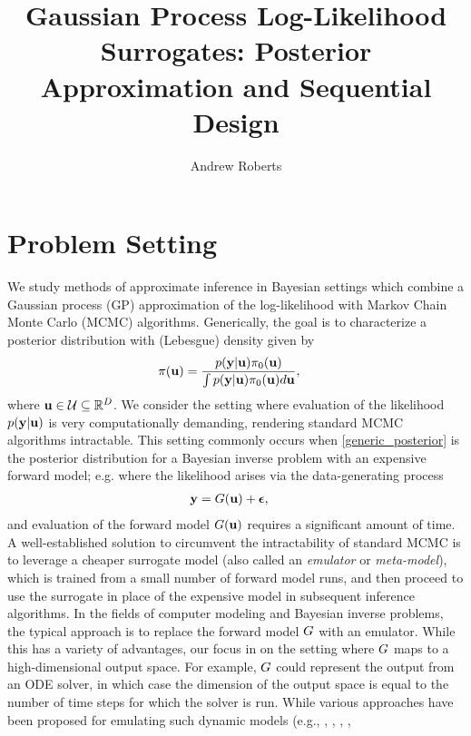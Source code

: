 \documentclass[12pt]{article}
\title{Gaussian Process Log-Likelihood Surrogates: Posterior Approximation and Sequential Design}
\author{Andrew Roberts}
\begin{document}
\maketitle

\section{Problem Setting}
We study methods of approximate inference in Bayesian settings which combine a Gaussian process (GP) approximation of the log-likelihood 
with Markov Chain Monte Carlo (MCMC) algorithms. Generically, the goal is to characterize a posterior distribution with (Lebesgue) density 
given by 
\begin{align}
\pi(\mathbf{u}) &= \frac{p(\mathbf{y}|\mathbf{u})\pi_0(\mathbf{u})}{\int p(\mathbf{y}|\mathbf{u})\pi_0(\mathbf{u}) d\mathbf{u}}, \label{generic_posterior}
\end{align}
where $\mathbf{u} \in \mathcal{U} \subseteq \mathbb{R}^{D}$. We consider the setting where evaluation of the likelihood $p(\mathbf{y}|\mathbf{u})$ is very 
computationally demanding, rendering standard MCMC algorithms intractable. This setting commonly occurs when \ref{generic_posterior} is the 
posterior distribution for a Bayesian inverse problem with an expensive forward model; e.g. where the likelihood arises via the data-generating 
process 
\begin{align*}
\mathbf{y} &= G(\mathbf{u}) + \boldsymbol{\epsilon},
\end{align*}
and evaluation of the forward model $G(\mathbf{u})$ requires a significant amount of time. A well-established solution to circumvent the intractability of standard MCMC is 
to leverage a cheaper surrogate model (also called an \textit{emulator} or \textit{meta-model}), which is trained from a small number of forward model 
runs, and then proceed to use the surrogate in place of the expensive model in subsequent inference algorithms. In the fields of computer modeling and 
Bayesian inverse problems, the typical approach is to replace the forward model $G$ with an emulator. While this has a variety of advantages, our focus in on the 
setting where $G$ maps to a high-dimensional output space. For example, $G$ could represent the output from an ODE solver, in which case the dimension of the 
output space is equal to the number of time steps for which the solver is run. While various approaches have been proposed for emulating such dynamic models 
(e.g., \cite{GP_dynamic_emulation}, \cite{Bayesian_emulation_dynamic},  \cite{emulate_functional_output}, \cite{emulate_dynamic_epidemic_model}, 
\end{document}

